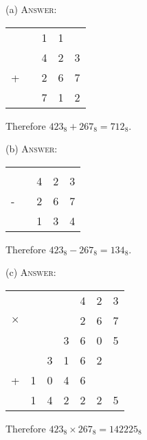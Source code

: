 
(a)
\textsc{Answer:}\vspace{-2mm}
\begin{answerlong}
\begin{longtable}{ccccc}
  &   & 1 & 1 &   \\
  &   & 4 & 2 & 3 \\
+ &   & 2 & 6 & 7 \\ \hline
  &   & 7 & 1 & 2 \\ \hline
\end{longtable}
Therefore $423_{8} + 267_{8} = 712_{8}$.
\end{answerlong}
  
(b)
\textsc{Answer:}\vspace{-2mm}
\begin{answerlong}
\begin{longtable}{ccccc}
  &   &   &   &   \\
  &   & 4 & 2 & 3 \\
- &   & 2 & 6 & 7 \\ \hline
  &   & 1 & 3 & 4 \\ \hline
\end{longtable}
Therefore $423_{8} - 267_{8} = 134_{8}$.
\end{answerlong}

(c)
\textsc{Answer:}\vspace{-2mm}
\begin{answerlong}
\begin{longtable}{ccccccc}
         &   &   &   & 4 & 2 & 3 \\
$\times$ &   &   &   & 2 & 6 & 7 \\ \hline
         &   &   & 3 & 6 & 0 & 5 \\
         &   & 3 & 1 & 6 & 2 &   \\
 +       & 1 & 0 & 4 & 6 &   &   \\ \hline
         & 1 & 4 & 2 & 2 & 2 & 5 \\ \hline
\end{longtable}
Therefore $423_{8} \times 267_{8} = 142225_{8}$
\end{answerlong}
